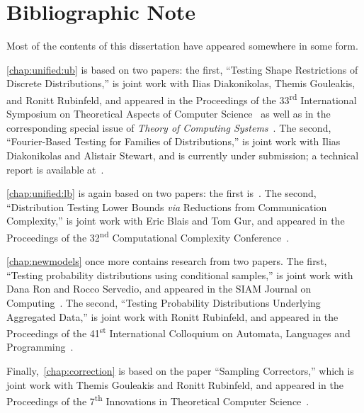 \chapter{Bibliographic Note} %
\thispagestyle{plain} %

\noindent Most of the contents of this dissertation have appeared somewhere in some form.

\cref{chap:unified:ub} is based on two papers: the first, ``Testing Shape Restrictions of Discrete Distributions,'' is joint work with Ilias Diakonikolas, Themis Gouleakis, and Ronitt Rubinfeld, and appeared in the Proceedings of the 33\textsuperscript{rd} International Symposium on Theoretical Aspects of Computer Science~\parencite{CDGR:16} as well as in the corresponding special issue of \textit{Theory of Computing Systems}~\parencite{CDGR:17:journal}. The second, ``Fourier-Based Testing for Families of Distributions,'' is joint work with Ilias Diakonikolas and Alistair Stewart, and is currently under submission; a technical report is available at~\parencite{CanonneDS:17}.

\cref{chap:unified:lb} is again based on two papers: the first is~\parencite{CDGR:16}. The second, ``Distribution Testing Lower Bounds \textit{via} Reductions from Communication Complexity,'' is joint work with Eric Blais and Tom Gur, and appeared in the Proceedings of the 32\textsuperscript{nd} Computational Complexity Conference~\parencite{BCG:17}.

\cref{chap:newmodels} once more contains research from two papers. The first, ``Testing probability distributions using conditional samples,'' is joint work with Dana Ron and Rocco Servedio, and appeared in the SIAM Journal on Computing~\parencite{CRS:15}. The second, ``Testing Probability Distributions Underlying Aggregated Data,'' is joint work with Ronitt Rubinfeld, and appeared in the Proceedings of the 41\textsuperscript{st} International Colloquium on Automata, Languages and Programming~\parencite{CR:14}.

Finally,~\cref{chap:correction} is based on the paper ``Sampling Correctors,'' which is joint work with Themis Gouleakis and Ronitt Rubinfeld, and appeared in the Proceedings of the 7\textsuperscript{th} Innovations in Theoretical Computer Science~\parencite{CGR:16}.

